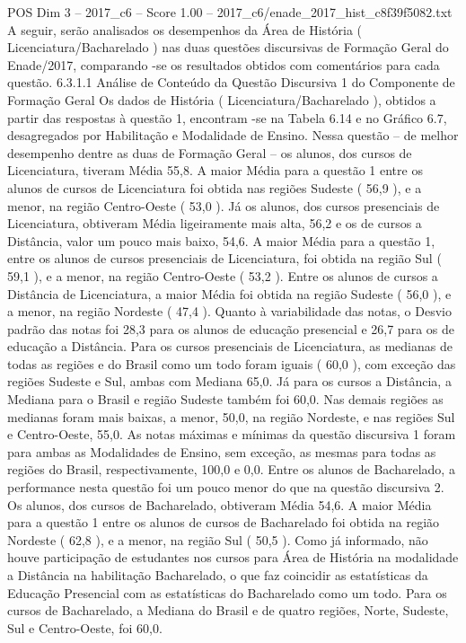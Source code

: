 \begin{textsample}{POS Dim 3 – 2017\_c6 – Score 1.00 – 2017\_c6/enade\_2017\_hist\_c8f39f5082.txt}
A seguir, serão analisados os desempenhos da Área de História ( Licenciatura/Bacharelado ) nas duas questões discursivas de Formação Geral do Enade/2017, comparando -se os resultados obtidos com comentários para cada questão. 6.3.1.1 Análise de Conteúdo da Questão Discursiva 1 do Componente de Formação Geral Os dados de História ( Licenciatura/Bacharelado ), obtidos a partir das respostas à questão 1, encontram -se na Tabela 6.14 e no Gráfico 6.7, desagregados por Habilitação e Modalidade de Ensino.
Nessa questão – de melhor desempenho dentre as duas de Formação Geral – os alunos, dos cursos de Licenciatura, tiveram Média 55,8.
A maior Média para a questão 1 entre os alunos de cursos de Licenciatura foi obtida nas regiões Sudeste ( 56,9 ), e a menor, na região Centro-Oeste ( 53,0 ).
Já os alunos, dos cursos presenciais de Licenciatura, obtiveram Média ligeiramente mais alta, 56,2 e os de cursos a Distância, valor um pouco mais baixo, 54,6.
A maior Média para a questão 1, entre os alunos de cursos presenciais de Licenciatura, foi obtida na região Sul ( 59,1 ), e a menor, na região Centro-Oeste ( 53,2 ).
Entre os alunos de cursos a Distância de Licenciatura, a maior Média foi obtida na região Sudeste ( 56,0 ), e a menor, na região Nordeste ( 47,4 ).
Quanto à variabilidade das notas, o Desvio padrão das notas foi 28,3 para os alunos de educação presencial e 26,7 para os de educação a Distância.
Para os cursos presenciais de Licenciatura, as medianas de todas as regiões e do Brasil como um todo foram iguais ( 60,0 ), com exceção das regiões Sudeste e Sul, ambas com Mediana 65,0.
Já para os cursos a Distância, a Mediana para o Brasil e região Sudeste também foi 60,0.
Nas demais regiões as medianas foram mais baixas, a menor, 50,0, na região Nordeste, e nas regiões Sul e Centro-Oeste, 55,0.
As notas máximas e mínimas da questão discursiva 1 foram para ambas as Modalidades de Ensino, sem exceção, as mesmas para todas as regiões do Brasil, respectivamente, 100,0 e 0,0.
Entre os alunos de Bacharelado, a performance nesta questão foi um pouco menor do que na questão discursiva 2.
Os alunos, dos cursos de Bacharelado, obtiveram Média 54,6.
A maior Média para a questão 1 entre os alunos de cursos de Bacharelado foi obtida na região Nordeste ( 62,8 ), e a menor, na região Sul ( 50,5 ).
Como já informado, não houve participação de estudantes nos cursos para Área de História na modalidade a Distância na habilitação Bacharelado, o que faz coincidir as estatísticas da Educação Presencial com as estatísticas do Bacharelado como um todo.
Para os cursos de Bacharelado, a Mediana do Brasil e de quatro regiões, Norte, Sudeste, Sul e Centro-Oeste, foi 60,0.

\end{textsample}
